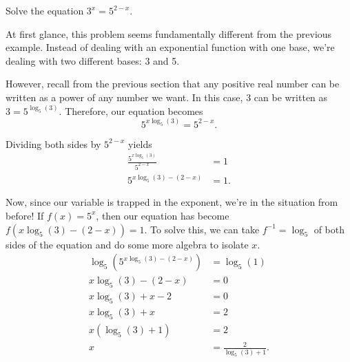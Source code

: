 \documentclass[nooutcomes]{ximera}
\begin{document}
\begin{example}
Solve the equation $3^x = 5^{2 - x}$. 
\end{example}

\begin{explanation}
At first glance, this problem seems fundamentally different from the previous example. Instead of dealing with an exponential function with one base, we're dealing with two different bases: 3 and 5. 

However, recall from the previous section that any positive real number can be written as a power of any number we want. In this case, 3 can be written as $3 = 5^{\log_5(3)}$. Therefore, our equation becomes
$$
5^{x\log_5(3)} = 5^{2 - x}.
$$

Dividing both sides by $5^{2 - x}$ yields 
\begin{align*}
\frac{5^{x\log_5(3)}}{5^{2 - x}} & = 1 \\
5^{x \log_5(3) - (2 - x)} & = 1.
\end{align*}

Now, since our variable is trapped in the exponent, we're in the situation from before! If $f(x) = 5^x$, then our equation has become $f(x \log_5(3) - (2 - x)) = 1$. To solve this, we can take $f^{-1} = \log_5$ of both sides of the equation and do some more algebra to isolate $x$. 
\begin{align*}
\log_5(5^{x \log_5(3) - (2 - x)}) & = \log_5(1) \\
x \log_5(3) - (2 - x) & = 0 \\
x\log_5(3) + x - 2 & = 0 \\
x\log_5(3) + x & = 2 \\
x(\log_5(3) + 1) & = 2 \\
x & = \frac{2}{\log_5(3) + 1}.
\end{align*}
\end{explanation}
\end{document}
